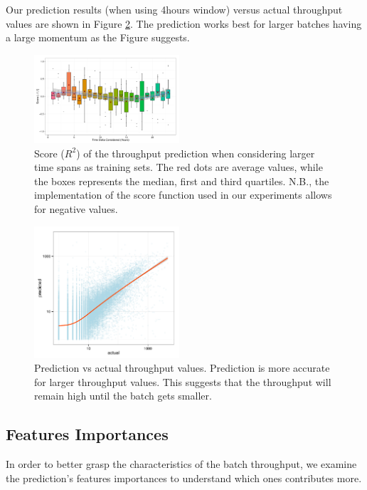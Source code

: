 Our prediction results (when using 4hours window) versus actual throughput values are shown in Figure \ref{fig:pred}. The prediction works best for larger batches having a large momentum as the Figure suggests.

\begin{figure}[tb]
	\centering
		\includegraphics[width=0.48\textwidth]{figures/ML_accuracy}
	\caption{Score ($R^2$) of the throughput prediction when considering larger time spans as training sets. The red dots are average values, while the boxes represents the median, first and third quartiles. N.B., the implementation of the score function used in our experiments allows for negative values.}
	\label{fig:accuracy}
\end{figure}

\begin{figure}[tb]
	\centering
		\includegraphics[width=0.48\textwidth]{figures/predictions_3}
	\caption{Prediction vs actual throughput values. Prediction is more accurate for larger throughput values. This suggests that the throughput will remain high until the batch gets smaller.}
	\label{fig:pred}
\end{figure}

\subsection{Features Importances}
In order to better grasp the characteristics of the batch throughput, we examine the prediction's features importances to understand which ones contributes more.

